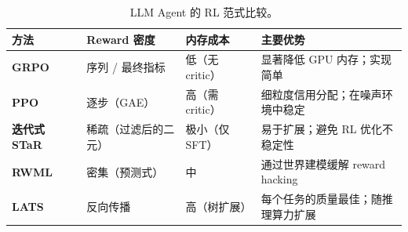 \begin{table}[ht!]
\centering\small
\caption{LLM Agent 的 RL 范式比较。}
\noindent\begin{tabularx}{\linewidth}{@{}l Z{0.85} Z{0.47} Z{1.68}@{}}
\toprule
\textbf{方法} & \textbf{Reward 密度} & \textbf{内存成本} & \textbf{主要优势} \\
\midrule
\textbf{GRPO}~\cite{shao2024deepseekmath} & 序列 / 最终指标 & 低（无 critic） & 显著降低 GPU 内存；实现简单 \\
\textbf{PPO}~\cite{schulman2017proximal} & 逐步（GAE） & 高（需 critic） & 细粒度信用分配；在噪声环境中稳定 \\
\textbf{迭代式 STaR}~\cite{zelikman2022star} & 稀疏（过滤后的二元） & 极小（仅 SFT） & 易于扩展；避免 RL 优化不稳定性 \\
\textbf{RWML}~\cite{yu2026rwml} & 密集（预测式） & 中 & 通过世界建模缓解 reward hacking \\
\textbf{LATS}~\cite{zhou2024lats} & 反向传播 & 高（树扩展） & 每个任务的质量最佳；随推理算力扩展 \\
\bottomrule
\end{tabularx}
\end{table}
